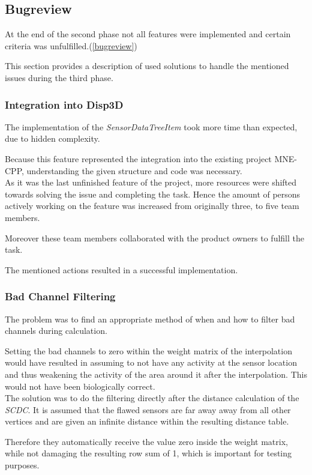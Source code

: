 \subsection{Bugreview}
At the end of the second phase not all features were implemented and certain criteria was unfulfilled.(\ref{bugreview})

This section provides a description of used solutions to handle the mentioned issues during the third phase.

\subsubsection{Integration into Disp3D} The implementation of the \textit{SensorDataTreeItem} took more time than expected, due to hidden complexity. 

Because this feature represented the integration into the existing project MNE-CPP, understanding the given structure and code was necessary.
\\
As it was the last unfinished feature of the project, more resources were shifted towards solving the issue and completing the task. Hence the amount of persons actively working on the feature was increased from originally three, to five team members.  

Moreover these team members collaborated with the product owners to fulfill the task. 

The mentioned actions resulted in a successful implementation.

\subsubsection{Bad Channel Filtering}The problem was to find an appropriate method of when and how to filter bad channels during calculation. 

Setting the bad channels to zero within the weight matrix of the interpolation would have resulted in assuming to not have any activity at the sensor location and thus weakening the activity of the area around it after the interpolation. This would not have been biologically correct. 
\\

The solution was to do the filtering directly after the distance calculation of the \textit{SCDC}. It is assumed that the flawed sensors are far away away from all other vertices and  are given an infinite distance within the resulting distance table. 

Therefore they automatically receive the value zero inside the weight matrix, while not damaging the resulting row sum of 1, which is important for testing purposes.